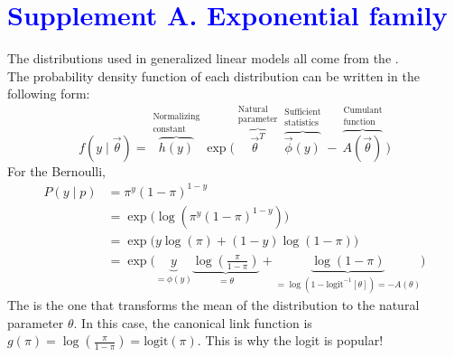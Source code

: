 \documentclass[11pt]{article}
\newcommand{\logit}{\text{logit}}
\newcommand{\bblue}[1]{\textbf{\textcolor{blue}{#1}}}
\newcommand{\bgreen}[1]{\textbf{\color{olive}{#1}}}
\begin{document}
\section*{\bblue{Supplement A. Exponential family}}
\label{exponentialFamily}
The distributions used in generalized linear models all come from the \bgreen{exponential family}. \\ The probability density function of each distribution can be written in the following form:
$$f(y\mid \vec\theta) = \overbrace{h(y)}^{\substack{\text{Normalizing}\\\text{constant}}} \exp\bigg(\overbrace{{\vec\theta}^T}^{\substack{\text{Natural}\\\text{parameter}}}\overbrace{\vec\phi(y)}^{\substack{\text{Sufficient}\\\text{statistics}}} - \overbrace{A\left(\vec\theta\right)}^{\substack{\text{Cumulant}\\\text{function}}}\bigg)$$
\bgreen{Ex.} For the Bernoulli,
$$\begin{aligned}
P(y\mid p) &= \pi^y(1-\pi)^{1-y} \\
&= \exp\bigg(\log\left(\pi^y(1-\pi)^{1-y}\right)\bigg) \\
&= \exp\bigg(y\log(\pi) + (1 - y)\log(1 - \pi)\bigg) \\
&= \exp\bigg(\underbrace{y}_{=\phi(y)}\underbrace{\log\left(\frac{\pi}{1-\pi}\right)}_{=\theta} + \underbrace{\log(1 - \pi)}_{=\log(1 - \logit^{-1}[\theta]) = -A(\theta)}\bigg)
\end{aligned}$$
The \bgreen{canonical link function} is the one that transforms the mean of the distribution to the natural parameter $\theta$. In this case, the canonical link function is $g(\pi) = \log\left(\frac{\pi}{1-\pi}\right) = \logit(\pi)$. This is why the logit is popular!
\end{document}
